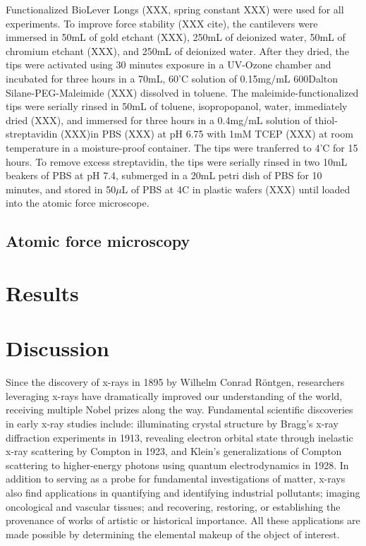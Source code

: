 \documentclass[%
  aip,12pt,tightenlines,
  amsthm,
 amsmath,amssymb,
 reprint,%
]{revtex4-1}
\newcommand{\sLabel}[1]{\label{section:#1}}
\newcommand{\firstp}[0]{\noindent}
\newcommand{\pl}[0]{\vspace{6pt}}
\begin{document}
\firstp Functionalized BioLever Longs (XXX, spring constant XXX) were used for all experiments. To improve force stability (XXX cite), the cantilevers were immersed in 50mL of gold etchant (XXX), 250mL of deionized water, 50mL of chromium etchant (XXX), and 250mL of deionized water. After they dried, the tips were activated using 30 minutes exposure in a UV-Ozone chamber and incubated for three hours in a 70mL, 60'C solution of 0.15mg/mL 600Dalton Silane-PEG-Maleimide (XXX) dissolved in toluene. The maleimide-functionalized tips were serially rinsed in 50mL of toluene, isopropopanol, water, immediately dried (XXX), and immersed for three hours in a 0.4mg/mL solution of thiol-streptavidin (XXX)in PBS (XXX) at pH 6.75 with 1mM TCEP (XXX) at room temperature in a moisture-proof container. The tips were tranferred to 4'C for 15 hours. To remove excess streptavidin, the tips were serially rinsed in two 10mL beakers of PBS at pH 7.4, submerged in a 20mL petri dish of PBS for 10 minutes, and stored in 50$\mu$L of PBS at 4C in plastic wafers (XXX) until loaded into the atomic force microscope. \pl

\subsection{\sLabel{Surface}Atomic force microscopy}

\section{\sLabel{Results}Results}

\section{\sLabel{Discussion}Discussion}


\firstp Since the discovery of x-rays in 1895 by Wilhelm Conrad R{\"o}ntgen, researchers leveraging x-rays have dramatically improved our understanding of the world, receiving multiple Nobel prizes along the way.\cite{santra_concepts_2009} Fundamental scientific discoveries in early x-ray studies include: illuminating crystal structure by Bragg's x-ray diffraction experiments in 1913,\cite{bragg_reflection_1913} revealing electron orbital state through inelastic x-ray scattering by Compton in 1923,\cite{compton_spectrum_1923} and Klein's generalizations of Compton scattering to higher-energy photons using quantum electrodynamics in 1928.\cite{klein_scattering_1928} In addition to serving as a probe for fundamental investigations of matter, x-rays also find applications in quantifying and identifying industrial pollutants;\cite{luo_determination_2012} imaging oncological and vascular tissues;\cite{butler_bio-medical_2008} and recovering, restoring, or establishing the provenance of works of artistic \cite{janssens_photon-based_2010} or historical \cite{bergmann_archimedes_2007} importance. All these applications are made possible by determining the elemental makeup of the object of interest. \pl
\end{document}
